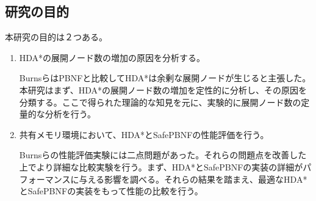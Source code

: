 \documentclass[uplatex]{jsarticle}
\begin{document}

\subsection{研究の目的}

本研究の目的は２つある。

\begin{enumerate}
\item HDA*の展開ノード数の増加の原因を分析する。
\newline

BurnsらはPBNFと比較してHDA*は余剰な展開ノードが生じると主張した。本研究はまず、HDA*の展開ノード数の増加を定性的に分析し、その原因を分類する。ここで得られた理論的な知見を元に、実験的に展開ノード数の定量的な分析を行う。
\newline


\item 共有メモリ環境において、HDA*とSafePBNFの性能評価を行う。
\newline

Burnsらの性能評価実験には二点問題があった。それらの問題点を改善した上でより詳細な比較実験を行う。まず、HDA*とSafePBNFの実装の詳細がパフォーマンスに与える影響を調べる。それらの結果を踏まえ、最適なHDA*とSafePBNFの実装をもって性能の比較を行う。


\end{enumerate}
\end{document}
